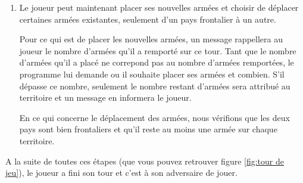 \begin{enumerate}
    \item Le joueur peut maintenant placer ses nouvelles armées et choisir de déplacer certaines armées existantes, seulement d'un pays frontalier à un autre.
    
    Pour ce qui est de placer les nouvelles armées, un message rappellera au joueur le nombre d'armées qu'il a remporté sur ce tour. Tant que le nombre d'armées qu'il a placé ne correpond pas au nombre d'armées remportées, le programme lui demande ou il souhaite placer ses armées et combien. S'il dépasse ce nombre, seulement le nombre restant d'armées sera attribué au territoire et un message en informera le joueur.
    
    En ce qui concerne le déplacement des armées, nous vérifions que les deux pays sont bien frontaliers et qu'il reste au moins une armée sur chaque territoire.
    
\end{enumerate}

A la suite de toutes ces étapes (que vous pouvez retrouver figure \ref{fig:tour de jeu}), le joueur a fini son tour et c'est à son adversaire de jouer.

